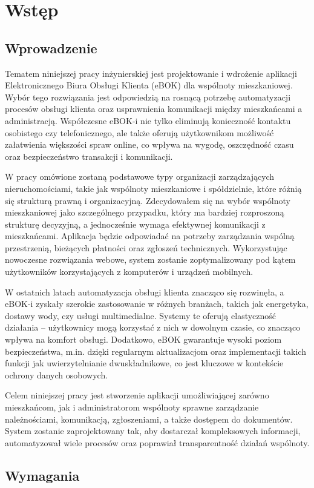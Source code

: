 \chapter{Wstęp}
\section{Wprowadzenie}
Tematem niniejszej pracy inżynierskiej jest projektowanie i wdrożenie aplikacji Elektronicznego Biura Obsługi Klienta (eBOK) dla wspólnoty mieszkaniowej. Wybór tego rozwiązania jest odpowiedzią na rosnącą potrzebę automatyzacji procesów obsługi klienta oraz usprawnienia komunikacji między mieszkańcami a administracją. Współczesne eBOK-i nie tylko eliminują konieczność kontaktu osobistego czy telefonicznego, ale także oferują użytkownikom możliwość załatwienia większości spraw online, co wpływa na wygodę, oszczędność czasu oraz bezpieczeństwo transakcji i komunikacji.

W pracy omówione zostaną podstawowe typy organizacji zarządzających nieruchomościami, takie jak wspólnoty mieszkaniowe i spółdzielnie, które różnią się strukturą prawną i organizacyjną. Zdecydowałem się na wybór wspólnoty mieszkaniowej jako szczególnego przypadku, który ma bardziej rozproszoną strukturę decyzyjną, a jednocześnie wymaga efektywnej komunikacji z mieszkańcami. Aplikacja będzie odpowiadać na potrzeby zarządzania wspólną przestrzenią, bieżących płatności oraz zgłoszeń technicznych. Wykorzystując nowoczesne rozwiązania webowe, system zostanie zoptymalizowany pod kątem użytkowników korzystających z komputerów i urządzeń mobilnych.

W ostatnich latach automatyzacja obsługi klienta znacząco się rozwinęła, a eBOK-i zyskały szerokie zastosowanie w różnych branżach, takich jak energetyka, dostawy wody, czy usługi multimedialne. Systemy te oferują elastyczność działania – użytkownicy mogą korzystać z nich w dowolnym czasie, co znacząco wpływa na komfort obsługi. Dodatkowo, eBOK gwarantuje wysoki poziom bezpieczeństwa, m.in. dzięki regularnym aktualizacjom oraz implementacji takich funkcji jak uwierzytelnianie dwuskładnikowe, co jest kluczowe w kontekście ochrony danych osobowych.

Celem niniejszej pracy jest stworzenie aplikacji umożliwiającej zarówno mieszkańcom, jak i administratorom wspólnoty sprawne zarządzanie należnościami, komunikacją, zgłoszeniami, a także dostępem do dokumentów. System zostanie zaprojektowany tak, aby dostarczał kompleksowych informacji, automatyzował wiele procesów oraz poprawiał transparentność działań wspólnoty.

\section{Wymagania}

